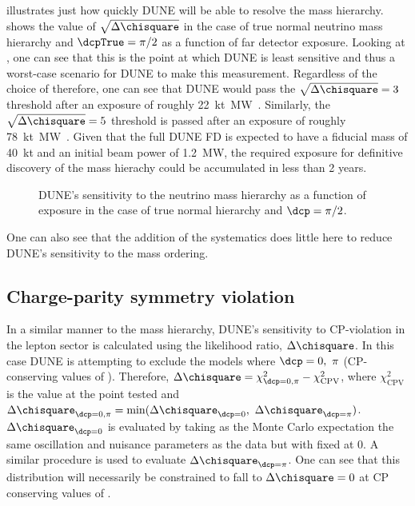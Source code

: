  illustrates just how quickly DUNE will be able to resolve the mass hierarchy.
 shows the value of $\sqrt{\Delta\chisquare}$ in the case of true normal neutrino mass hierarchy and $\dcpTrue = \pi/2$ as a function of far detector exposure. 
Looking at , one can see that this is the point at which DUNE is least sensitive and thus a worst-case scenario for DUNE to make this measurement.
Regardless of the choice of \dcp therefore, one can see that DUNE would pass the $\sqrt{\Delta\chisquare}=3$ threshold after an exposure of roughly \SI{22}{\kilo\tonne\mega\watt\year}.
Similarly, the $\sqrt{\Delta\chisquare}=5$ threshold is passed after an exposure of roughly \SI{78}{\kilo\tonne\mega\watt\year}.
Given that the full DUNE FD is expected to have a fiducial mass of \SI{40}{\kilo\tonne} and an initial beam power of \SI{1.2}{\mega\watt}, the required exposure for definitive discovery of the mass hierachy could be accumulated in less than 2 years.

\begin{figure}[h]
	\begin{adjustbox}{max totalsize=.6\linewidth, center}
		
	\end{adjustbox}
	\caption[DUNE's sensitivity to the neutrino mass hierarchy as a function of exposure]{DUNE's sensitivity to the neutrino mass hierarchy as a function of exposure in the case of true normal hierarchy and $\dcp=\pi/2$.}
	\label{fig:mhSensExp}
\end{figure}

One can also see that the addition of the systematics does little here to reduce DUNE's sensitivity to the mass ordering.

\subsection{Charge-parity symmetry violation}
\label{sec:dune_lbl:sensitivities:cpv}

In a similar manner to the mass hierarchy, DUNE's sensitivity to CP-violation in the lepton sector is calculated using the likelihood ratio, $\Delta \chisquare$.
In this case DUNE is attempting to exclude the models where $\dcp = 0,~\pi$ (CP-conserving values of \dcp).
Therefore, $\Delta \chisquare = \chi^{2}_{\dcp=0,\pi} - \chi^{2}_{\text{CPV}}$, where $\chi^{2}_{\text{CPV}}$ is the \chisquare value at the \dcp point tested and $\Delta \chisquare_{\dcp=0,\pi} = \min(\Delta \chisquare_{\dcp=0},~\Delta \chisquare_{\dcp=\pi})$.
$\Delta \chisquare_{\dcp=0}$ is evaluated by taking as the Monte Carlo expectation the same oscillation and nuisance parameters as the data but with \dcp fixed at 0.
A similar procedure is used to evaluate $\Delta \chisquare_{\dcp=\pi}$.
One can see that this distribution will necessarily be constrained to fall to $\Delta \chisquare = 0$ at CP conserving values of \dcp.

